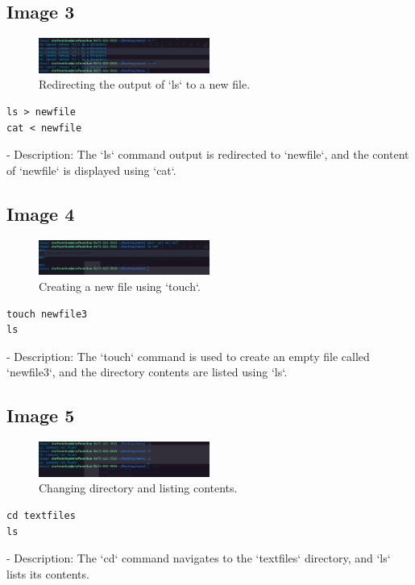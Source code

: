 \documentclass[12pt]{article}
\begin{document}
\subsection*{Image 3}
\begin{figure}[h!]
    \centering
    \includegraphics[width=0.5\textwidth]{3.png}
    \caption{Redirecting the output of `ls` to a new file.}
\end{figure}
\begin{lstlisting}
ls > newfile
cat < newfile
\end{lstlisting}
- Description: The `ls` command output is redirected to `newfile`, and the content of `newfile` is displayed using `cat`.

\subsection*{Image 4}
\begin{figure}[h!]
    \centering
    \includegraphics[width=0.5\textwidth]{4.png}
    \caption{Creating a new file using `touch`.}
\end{figure}
\begin{lstlisting}
touch newfile3
ls
\end{lstlisting}
- Description: The `touch` command is used to create an empty file called `newfile3`, and the directory contents are listed using `ls`.

\subsection*{Image 5}
\begin{figure}[h!]
    \centering
    \includegraphics[width=0.5\textwidth]{5.png}
    \caption{Changing directory and listing contents.}
\end{figure}
\begin{lstlisting}
cd textfiles
ls
\end{lstlisting}
- Description: The `cd` command navigates to the `textfiles` directory, and `ls` lists its contents.
\end{document}
